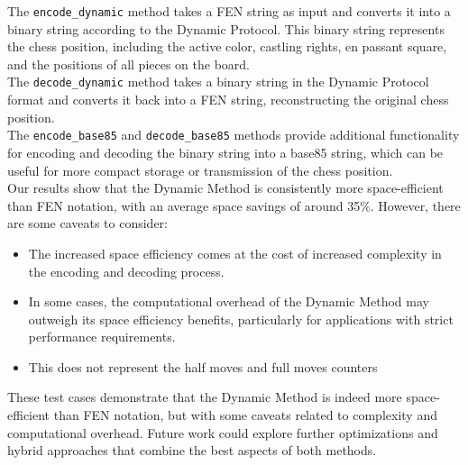 \documentclass{article}
\begin{document}
The \verb|encode_dynamic| method takes a FEN string as input and converts it into a binary string according to the Dynamic Protocol. This binary string represents the chess position, including the active color, castling rights, en passant square, and the positions of all pieces on the board.  \\

The \verb|decode_dynamic| method takes a binary string in the Dynamic Protocol format and converts it back into a FEN string, reconstructing the original chess position.  \\

The \verb|encode_base85| and \verb|decode_base85| methods provide additional functionality for encoding and decoding the binary string into a base85 string, which can be useful for more compact storage or transmission of the chess position. \\

Our results show that the Dynamic Method is consistently more space-efficient than FEN notation, with an average space savings of around 35\%. However, there are some caveats to consider:  

\begin{itemize}  
    \item The increased space efficiency comes at the cost of increased complexity in the encoding and decoding process.
    \item In some cases, the computational overhead of the Dynamic Method may outweigh its space efficiency benefits, particularly for applications with strict performance requirements.  
    \item This does not represent the half moves and full moves counters
\end{itemize}  
   
These test cases demonstrate that the Dynamic Method is indeed more space-efficient than FEN notation, but with some caveats related to complexity and computational overhead. Future work could explore further optimizations and hybrid approaches that combine the best aspects of both methods.

\newpage
\end{document}
